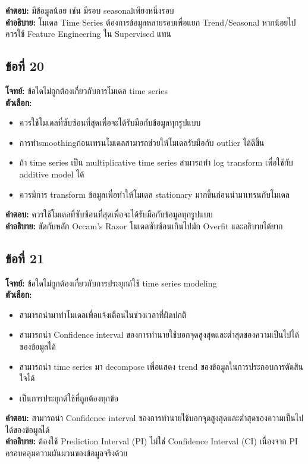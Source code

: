 \documentclass[12pt]{article}
\begin{document}
\textbf{คำตอบ:} มีข้อมูลน้อย เช่น มีรอบ seasonalเพียงหนึ่งรอบ\\
\textbf{คำอธิบาย:} โมเดล Time Series ต้องการข้อมูลหลายรอบเพื่อแยก Trend/Seasonal หากน้อยไปควรใช้ Feature Engineering ใน Supervised แทน

\subsection*{ข้อที่ 20}
\textbf{โจทย์:} ข้อใดไม่ถูกต้องเกี่ยวกับการโมเดล time series\\
\textbf{ตัวเลือก:}
\begin{itemize}
    \item ควรใช้โมเดลที่ซับซ้อนที่สุดเพื่อจะได้รับมือกับข้อมูลทุกรูปแบบ
    \item การทำsmoothingก่อนเทรนโมเดลสามารถช่วยให้โมเดลรับมือกับ outlier ได้ดีขึ้น
    \item ถ้า time series เป็น multiplicative time series สามารถทำ log transform เพื่อใช้กับ additive model ได้
    \item ควรมีการ transform ข้อมูลเพื่อทำให้โมเดล stationary มากขึ้นก่อนนำมาเทรนกับโมเดล
\end{itemize}

\textbf{คำตอบ:} ควรใช้โมเดลที่ซับซ้อนที่สุดเพื่อจะได้รับมือกับข้อมูลทุกรูปแบบ\\
\textbf{คำอธิบาย:} ขัดกับหลัก Occam's Razor โมเดลซับซ้อนเกินไปมัก Overfit และอธิบายได้ยาก

\subsection*{ข้อที่ 21}
\textbf{โจทย์:} ข้อใดไม่ถูกต้องเกี่ยวกับการประยุกต์ใช้ time series modeling\\
\textbf{ตัวเลือก:}
\begin{itemize}
    \item สามารถนำมาทำโมเดลเพื่อแจ้งเตือนในช่วงเวลาที่ผิดปกติ
    \item สามารถนำ Confidence interval ของการทำนายใช้บอกจุดสูงสุดและต่ำสุดของความเป็นไปได้ของข้อมูลได้
    \item สามารถนำ time series มา decompose เพื่อแสดง trend ของข้อมูลในการประกอบการตัดสินใจได้
    \item เป็นการประยุกต์ใช้ที่ถูกต้องทุกข้อ
\end{itemize}

\textbf{คำตอบ:} สามารถนำ Confidence interval ของการทำนายใช้บอกจุดสูงสุดและต่ำสุดของความเป็นไปได้ของข้อมูลได้\\
\textbf{คำอธิบาย:} ต้องใช้ Prediction Interval (PI) ไม่ใช่ Confidence Interval (CI) เนื่องจาก PI ครอบคลุมความผันผวนของข้อมูลจริงด้วย
\end{document}
